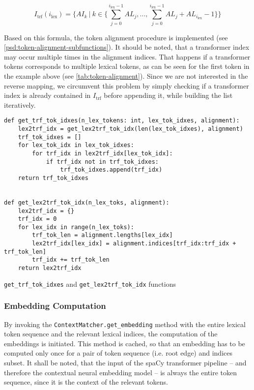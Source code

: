 \documentclass[11pt]{scrreprt}
\begin{document}
{\[I_{\text{trf}}(i_\text{lex}) = \{AI_k\ |\ k \in \{\sum_{j = 0}^{i_{\text{lex}} - 1} AL_j, ..., \sum_{j = 0}^{i_{\text{lex}} - 1} AL_j + AL_{i_{\text{lex}}} - 1 \}\}\]

Based on this formula, the token alignment procedure is implemented (see \cref{psd:token-alignment-subfunctions}). It should be noted, that a transformer index may occur multiple times in the alignment indices. That happens if a transformer tokens corresponds to multiple lexical tokens, as can be seen for the first token in the example above (see \cref{tab:token-alignment}). Since we are not interested in the reverse mapping, we circumvent this problem by simply checking if a transformer index is already contained in \(I_\text{trf}\) before appending it, while building the list iteratively.

\begin{pseudo}[htp]
\begin{lstlisting}
def get_trf_tok_idxes(n_lex_tokens: int, lex_tok_idxes, alignment):
    lex2trf_idx = get_lex2trf_tok_idx(len(lex_tok_idxes), alignment)
    trf_tok_idxes = []
    for lex_tok_idx in lex_tok_idxes:
        for trf_idx in lex2trf_idx[lex_tok_idx]:
            if trf_idx not in trf_tok_idxes:
                trf_tok_idxes.append(trf_idx)
    return trf_tok_idxes


def get_lex2trf_tok_idx(n_lex_toks, alignment):
    lex2trf_idx = {}
    trf_idx = 0
    for lex_idx in range(n_lex_toks):
        trf_tok_len = alignment.lengths[lex_idx]
        lex2trf_idx[lex_idx] = alignment.indices[trf_idx:trf_idx + trf_tok_len]
        trf_idx += trf_tok_len
    return lex2trf_idx
\end{lstlisting}
\caption{\texttt{get\_trf\_tok\_idxes} and \texttt{get\_lex2trf\_tok\_idx} functions}
\label{psd:token-alignment-subfunctions}
\end{pseudo}


\subsubsection{Embedding Computation}
By invoking the \texttt{ContextMatcher.get\_embedding} method with the entire lexical token sequence and the relevant lexical indices, the computation of the embeddings is initiated. This method is cached, so that an embedding has to be computed only once for a pair of token sequence (i.e. root edge) and indices subset.
It shall be noted, that the input of the spaCy transformer pipeline -- and therefore the contextual neural embedding model -- is always the entire token sequence, since it is the context of the relevant tokens. 

}
\end{document}
